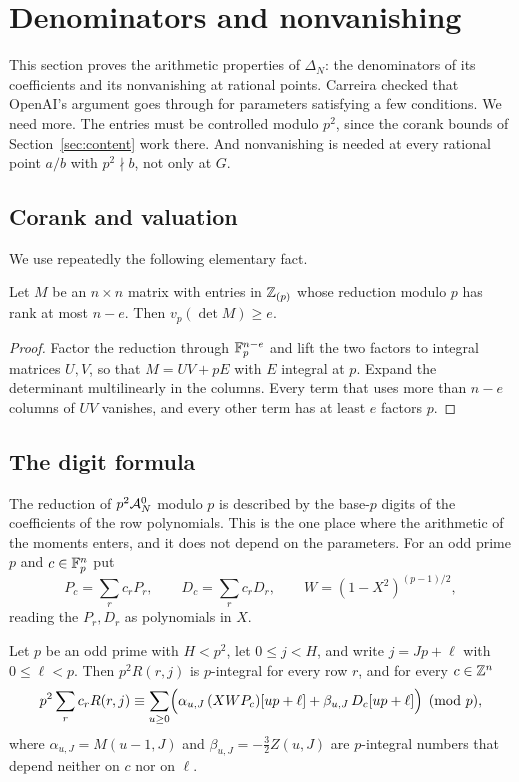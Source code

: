 \section{Denominators and nonvanishing}\label{sec:setup}

This section proves the arithmetic properties of $\Delta_N$: the denominators of its coefficients and its
nonvanishing at rational points. Carreira \cite{Carreira2026} checked that OpenAI's argument goes through
for parameters satisfying a few conditions. We need more. The entries must be controlled modulo $p^2$,
since the corank bounds of Section~\ref{sec:content} work there. And nonvanishing is needed at every
rational point $a/b$ with $p^2\nmid b$, not only at $G$.

\subsection{Corank and valuation}
We use repeatedly the following elementary fact.

\begin{lemma}\label{lem:rank-valuation}
Let $M$ be an $n\times n$ matrix with entries in $\mathbb Z_{(p)}$ whose reduction modulo $p$ has rank at most
$n-e$. Then $v_p(\det M)\ge e$.
\end{lemma}

\begin{proof}
Factor the reduction through $\mathbb F_p^{n-e}$ and lift the two factors to integral matrices $U,V$, so that
$M=UV+pE$ with $E$ integral at $p$. Expand the determinant multilinearly in the columns. Every term that
uses more than $n-e$ columns of $UV$ vanishes, and every other term has at least $e$ factors $p$.
\end{proof}

\subsection{The digit formula}
The reduction of $p^2\mathcal A^0_N$ modulo $p$ is described by the base-$p$ digits of the coefficients of the
row polynomials. This is the one place where the arithmetic of the moments enters, and it does not depend
on the parameters. For an odd prime $p$ and $c\in\mathbb F_p^n$ put
\[
 P_c=\sum_rc_rP_r,\qquad D_c=\sum_rc_rD_r,\qquad W=(1-X^2)^{(p-1)/2},
\]
reading the $P_r,D_r$ as polynomials in $X$.

\begin{lemma}\label{lem:digits}
Let $p$ be an odd prime with $H<p^2$, let $0\le j<H$, and write $j=Jp+\ell$ with $0\le\ell<p$. Then
$p^2R(r,j)$ is $p$-integral for every row $r$, and for every $c\in\mathbb Z^n$
\[
 p^2\sum_rc_rR(r,j)\equiv\sum_{u\ge0}\Bigl(\alpha_{u,J}\,(XWP_c)[up+\ell]+\beta_{u,J}\,D_c[up+\ell]\Bigr)
 \pmod p ,
\]
where $\alpha_{u,J}=M(u-1,J)$ and $\beta_{u,J}=-\tfrac32Z(u,J)$ are $p$-integral numbers that depend neither
on $c$ nor on $\ell$.
\end{lemma}

